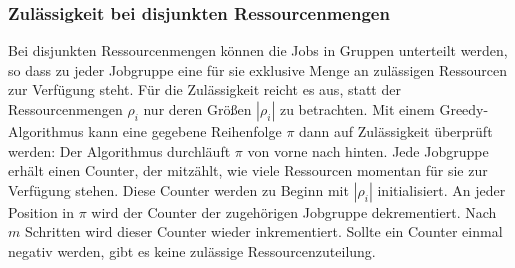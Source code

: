 \documentclass{scrreprt}
\begin{document}
\subsubsection{Zulässigkeit bei disjunkten Ressourcenmengen}
\label{subsubsec:ZulaessigkeitBeiDisjunktenRessourcenmengen}
Bei disjunkten Ressourcenmengen können die Jobs in Gruppen unterteilt werden, 
so dass zu jeder Jobgruppe eine für sie exklusive Menge an zulässigen Ressourcen zur Verfügung steht.
Für die Zulässigkeit reicht es aus, statt der Ressourcenmengen $\rho_i$ nur deren Größen $|\rho_i|$ zu betrachten.
Mit einem Greedy-Algorithmus kann eine gegebene Reihenfolge $\pi$ dann auf Zulässigkeit überprüft werden:
Der Algorithmus durchläuft $\pi$ von vorne nach hinten.
Jede Jobgruppe erhält einen Counter, der mitzählt, wie viele Ressourcen momentan für sie zur Verfügung stehen.
Diese Counter werden zu Beginn mit $|\rho_i|$ initialisiert.
An jeder Position in $\pi$ wird der Counter der zugehörigen Jobgruppe dekrementiert.
Nach $m$ Schritten wird dieser Counter wieder inkrementiert.
Sollte ein Counter einmal negativ werden, gibt es keine zulässige Ressourcenzuteilung.
\end{document}
